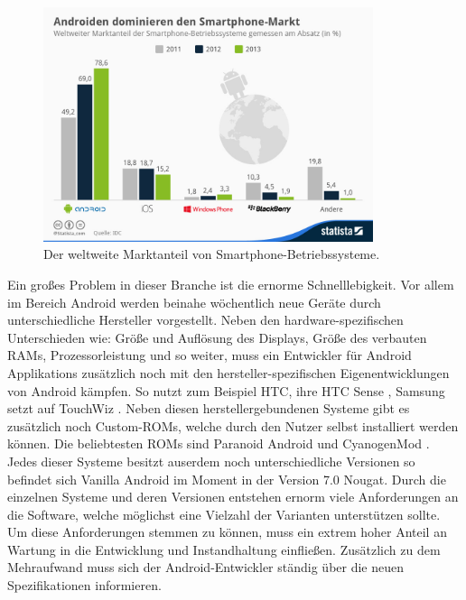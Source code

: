 \begin{figure}[H]
	\begin{center}
		\includegraphics[width=0.86\textwidth]{images/os.jpg}
		\caption{Der weltweite Marktanteil von Smartphone-Betriebssysteme. \cite{os}}
		\label{fig:os_fig}
	\end{center}
\end{figure}

Ein großes Problem in dieser Branche ist die ernorme Schnelllebigkeit. Vor allem im Bereich Android werden beinahe wöchentlich neue Geräte durch unterschiedliche Hersteller vorgestellt. Neben den hardware-spezifischen Unterschieden wie: Größe und Auflösung des Displays, Größe des verbauten RAMs, Prozessorleistung und so weiter, muss ein Entwickler für Android Applikations zusätzlich noch mit den hersteller-spezifischen Eigenentwicklungen von Android kämpfen. So nutzt zum Beispiel HTC, ihre HTC Sense \cite{htc_sense}, Samsung setzt auf TouchWiz \cite{touchwiz}. Neben diesen herstellergebundenen Systeme gibt es zusätzlich noch Custom-ROMs, welche durch den Nutzer selbst installiert werden können. Die beliebtesten ROMs sind Paranoid Android und CyanogenMod \cite{rom}. Jedes dieser Systeme besitzt auserdem noch unterschiedliche Versionen so befindet sich Vanilla Android im Moment in der Version 7.0 Nougat.
Durch die einzelnen Systeme und deren Versionen entstehen ernorm viele Anforderungen an die Software, welche möglichst eine Vielzahl der Varianten unterstützen sollte. Um diese Anforderungen stemmen zu können, muss ein extrem hoher Anteil an Wartung in die Entwicklung und Instandhaltung einfließen. Zusätzlich zu dem Mehraufwand muss sich der Android-Entwickler ständig über die neuen Spezifikationen informieren.

